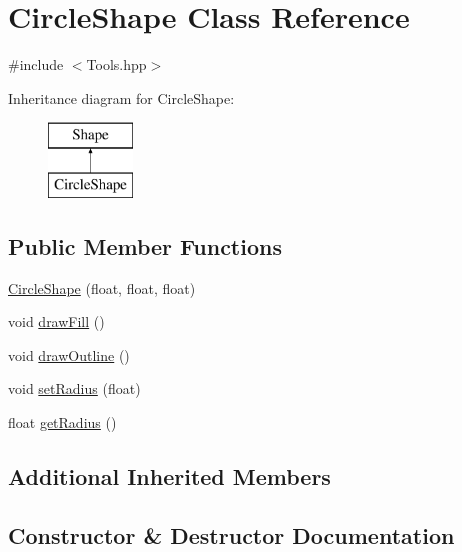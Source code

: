 \hypertarget{class_circle_shape}{}\section{Circle\+Shape Class Reference}
\label{class_circle_shape}


{\ttfamily \#include $<$Tools.\+hpp$>$}

Inheritance diagram for Circle\+Shape\+:\begin{figure}[H]
\begin{center}
\leavevmode
\includegraphics[height=2.000000cm]{class_circle_shape}
\end{center}
\end{figure}
\subsection*{Public Member Functions}
\begin{DoxyCompactItemize}
\item 
\hyperlink{class_circle_shape_a4e5614b889576afbd5c744ca39129a73}{Circle\+Shape} (float, float, float)
\item 
void \hyperlink{class_circle_shape_a4bdbdab71c47dd560ba58b4d21659be1}{draw\+Fill} ()
\item 
void \hyperlink{class_circle_shape_a42fe963aa4872668748f0ba882f49878}{draw\+Outline} ()
\item 
void \hyperlink{class_circle_shape_af317d58be28370ba183df07734fde939}{set\+Radius} (float)
\item 
float \hyperlink{class_circle_shape_a931eb9fffe6985d45717bf8175960503}{get\+Radius} ()
\end{DoxyCompactItemize}
\subsection*{Additional Inherited Members}


\subsection{Constructor \& Destructor Documentation}
\hypertarget{class_circle_shape_a4e5614b889576afbd5c744ca39129a73}{}\label{class_circle_shape_a4e5614b889576afbd5c744ca39129a73} 
